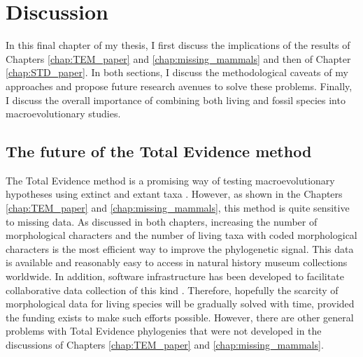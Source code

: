 \chapter{Discussion}
\label{chap:discussion}

%
%

In this final chapter of my thesis, I first discuss the implications of the results of Chapters \ref{chap:TEM_paper} and \ref{chap:missing_mammals} and then of Chapter \ref{chap:STD_paper}.
In both sections, I discuss the methodological caveats of my approaches and propose future research avenues to solve these problems.
Finally, I discuss the overall importance of combining both living and fossil species into macroevolutionary studies.

\section{The future of the Total Evidence method}
The Total Evidence method is a promising way of testing macroevolutionary hypotheses using extinct and extant taxa \citep[e.g.][]{ronquista2012,slaterphylogenetic2013,Wood01032013,beckancient2014,Dembo2015}.
However, as shown in the Chapters \ref{chap:TEM_paper} and \ref{chap:missing_mammals}, this method is quite sensitive to missing data.
As discussed in both chapters, increasing the number of morphological characters and the number of living taxa with coded morphological characters is the most efficient way to improve the phylogenetic signal. %
This data is available and reasonably easy to access in natural history museum collections worldwide. 
In addition, software infrastructure has been developed to facilitate collaborative data collection of this kind \citep{morphobank}.
Therefore, hopefully the scarcity of morphological data for living species will be gradually solved with time, provided the funding exists to make such efforts possible.
However, there are other general problems with Total Evidence phylogenies that were not developed in the discussions of Chapters \ref{chap:TEM_paper} and \ref{chap:missing_mammals}. 

